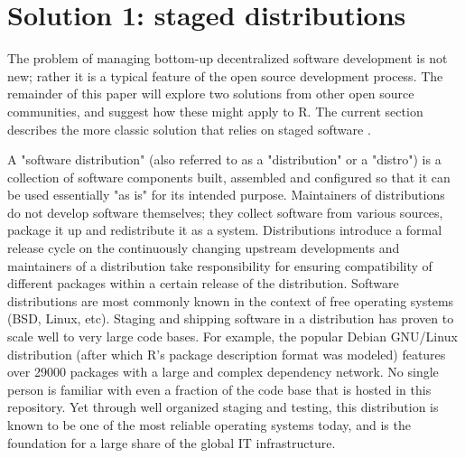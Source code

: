 \section{Solution 1: staged distributions}

The problem of managing bottom-up decentralized software development is not
new; rather it is a typical feature of the open source development
process. The remainder of this paper will explore two solutions from other open
source communities, and suggest how these might apply to R. The current section
describes the more classic solution that relies on staged software
.

A "software distribution" (also referred to as a "distribution" or a "distro")
is a collection of software components built, assembled and configured so that
it can be used essentially "as is" for its intended purpose. Maintainers of
distributions do not develop software themselves; they collect software from
various sources, package it up and redistribute it as a system. Distributions
introduce a formal release cycle on the continuously changing upstream
developments and maintainers of a distribution take responsibility for ensuring
compatibility of different packages within a certain release of the
distribution. Software distributions are most commonly known in the context of
free operating systems (BSD, Linux, etc). Staging and shipping software in a
distribution has proven to scale well to very large code bases. For example,
the popular Debian GNU/Linux distribution (after which R's package description
format was modeled) features over 29000 packages with a large and complex
dependency network. No single person is familiar with even a fraction of the
code base that is hosted in this repository. Yet through well organized staging and
testing, this distribution is known to be one of the most reliable operating
systems today, and is the foundation for a large share of the global IT
infrastructure.


